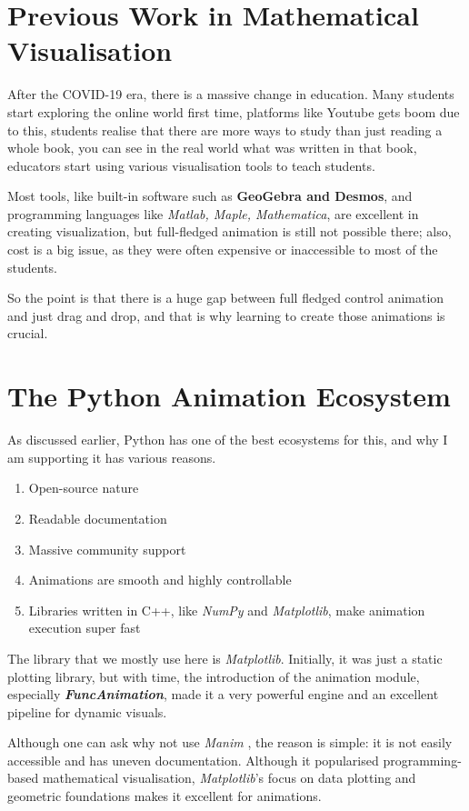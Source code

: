 \documentclass[12pt, a4paper]{report}
\begin{document}
\section{Previous Work in Mathematical Visualisation}
After the COVID-19 era, there is a massive change in education. Many students start exploring the online world first time, platforms like Youtube gets boom due to this, students realise that there are more ways to study than just reading a whole book, you can see in the real world what was written in that book, educators start using various visualisation tools to teach students.

Most tools, like built-in software such as \textbf{GeoGebra and Desmos}, and programming languages like \textit{Matlab, Maple, Mathematica}, are excellent in creating visualization, but full-fledged animation is still not possible there; also, cost is a big issue, as they were often expensive or inaccessible to most of the students.

So the point is that there is a huge gap between full fledged control animation and just drag and drop, and that is why learning to create those animations is crucial. 

\section{The Python Animation Ecosystem}

As discussed earlier, Python has one of the best ecosystems for this, and why I am supporting it has various reasons.

\begin{enumerate}
    \item Open-source nature
    \item Readable documentation
    \item Massive community support
    \item Animations are smooth and highly controllable
    \item Libraries written in C++, like \textit{NumPy} and \textit{Matplotlib}, make animation execution super fast
\end{enumerate}

The library that we mostly use here is \textit{Matplotlib}. Initially, it was just a static plotting library, but with time, the introduction of the animation module, especially \textbf{\textit{FuncAnimation}}, made it a very powerful engine and an excellent pipeline for dynamic visuals.

Although one can ask why not use \textit{Manim} , the reason is simple: it is not easily accessible and has uneven documentation. Although it popularised programming-based mathematical visualisation, \textit{Matplotlib}'s focus on data plotting and geometric foundations makes it excellent for animations.
\end{document}
